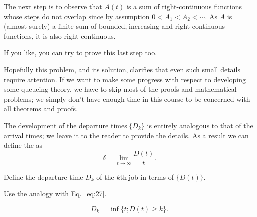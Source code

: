\begin{exercise}
\begin{solution}
    The next step is to observe that $A(t)$ is a sum of
    right-continuous functions whose steps do not overlap since by
    assumption $0<A_1 < A_2 < \cdots$. As $A$ is (almost surely)
    a finite sum of bounded, increasing and right-continuous functions,
    it is also right-continuous.

    If you like, you can try to prove this last step too. 

  Hopefully this problem, and its solution, clarifies that even such
  small details require attention. If we want to make some progress
  with respect to developing some queueing theory, we have to skip
  most of the proofs and mathematical problems; we simply don't have
  enough time in this course  to be concerned with all theorems
  and proofs.

 \end{solution}
\end{exercise}

The development of the departure times $\{D_k\}$ is entirely analogous
to that of the arrival times; we leave it to the reader to provide the
details. As a result we can define the  as
\begin{equation}\label{eq:28}
  \delta = \lim_{t\to\infty} \frac{D(t)}t.
\end{equation}


\begin{exercise}
  Define the departure time $D_{k}$ of the $k$th job in terms of
  $\{D(t)\}$. 
  \begin{hint}
Use the analogy with Eq.~\eqref{eq:27}.
  \end{hint}
\begin{solution}
  \begin{equation*}
 D_{k} = \inf\{t; D(t) \geq k\}.
  \end{equation*}
\end{solution}
\end{exercise}

